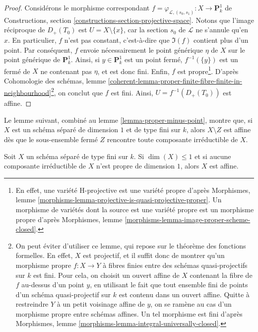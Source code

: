 \begin{proof}
\medskip\noindent
Considérons le morphisme correspondant
$f = \varphi_{\mathcal{L}, (s_0, s_1)} : X \to \mathbf{P}^1_k$
de Constructions, section \ref{constructions-section-projective-space}.
Notons que l'image réciproque de $D_{+}(T_0)$ est $U = X \setminus \{x\}$,
car la section $s_0$ de $\mathcal{L}$ ne s'annule qu'en $x$.
En particulier, $f$ n'est pas constant, c'est-à-dire que $\Im(f)$ contient
plus d'un point. Par conséquent, $f$ envoie nécessairement le point générique
$\eta$ de $X$ sur le point générique de $\mathbf{P}^1_k$.
Ainsi, si $y \in \mathbf{P}^1_k$ est un point fermé, $f^{-1}(\{y\})$
est un fermé de $X$ ne contenant pas $\eta$, et est donc fini.
Enfin, $f$ est propre\footnote{En effet, une variété H-projective
est une variété propre d'après Morphismes, lemme
\ref{morphisms-lemma-projective-is-quasi-projective-proper}.
Un morphisme de variétés dont la source est une variété propre est un morphisme propre
d'après Morphismes, lemme \ref{morphisms-lemma-image-proper-scheme-closed}.}.
D'après Cohomologie des schémas, lemme
\ref{coherent-lemma-proper-finite-fibre-finite-in-neighbourhood}\footnote{On
peut éviter d'utiliser ce lemme, qui repose sur le théorème des fonctions
formelles. En effet, $X$ est projectif, et il suffit donc de montrer
qu'un morphisme propre $f : X \to Y$ à fibres finies entre des schémas quasi-projectifs
sur $k$ est fini. Pour cela, on choisit un ouvert affine de $X$
contenant la fibre de $f$ au-dessus d'un point $y$, en utilisant le fait que tout ensemble fini de
points d'un schéma quasi-projectif sur $k$ est contenu dans un ouvert affine.
Quitte à restreindre $Y$ à un petit voisinage affine de $y$, on se ramène au
cas d'un morphisme propre entre schémas affines. Un tel morphisme est fini d'après
Morphismes, lemme \ref{morphisms-lemma-integral-universally-closed}.},
on conclut que $f$ est fini. Ainsi, $U = f^{-1}(D_{+}(T_0))$
est affine.
\end{proof}

\noindent
Le lemme suivant, combiné au lemme \ref{lemma-proper-minus-point},
montre que, si $X$ est un schéma séparé de dimension $1$ et
de type fini sur $k$, alors $X \setminus Z$ est affine dès que le
sous-ensemble fermé $Z$ rencontre toute composante irréductible de $X$.

\begin{lemma}
\label{lemma-dim-1-nonproper-affine}
Soit $X$ un schéma séparé de type fini sur $k$.
Si $\dim(X) \leq 1$ et si aucune composante irréductible de $X$
n'est propre de dimension $1$, alors $X$ est affine.
\end{lemma}

